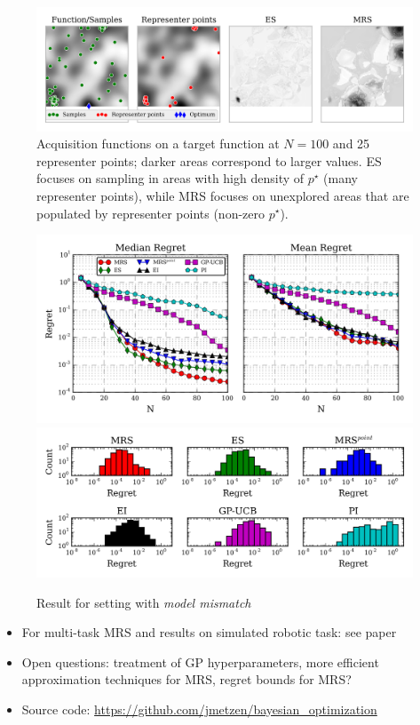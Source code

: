 \begin{block}{}
\begin{center}
\begin{figure}
\centering
\includegraphics[width=.8\textwidth]{../pics/es_analysis}
\caption{Acquisition functions on a target function at $N=100$ and 25 representer points; darker areas correspond to larger values. ES focuses on sampling in areas with high density of $p^\star$ (many representer points), while MRS focuses on unexplored areas that are populated by representer points (non-zero $p^\star$).
}
\label{fig:es_analysis}
\end{figure}


\begin{figure}
\centering
\includegraphics[width=.8\textwidth]{../pics/empirical_comparison_mm} \\
\includegraphics[width=.8\textwidth]{../pics/hist_mm}
\caption{Result for setting with \emph{model mismatch}}
\label{fig:empirical_comparison_mm}
\end{figure}

\end{center}
\end{block}

\begin{block}{}
\begin{itemize}
 \item For multi-task MRS and results on simulated robotic task: see paper
 \item Open questions: treatment of GP hyperparameters, more efficient approximation techniques for MRS, regret bounds for MRS?
 \item Source code: \url{https://github.com/jmetzen/bayesian_optimization}
\end{itemize}
\end{block}

